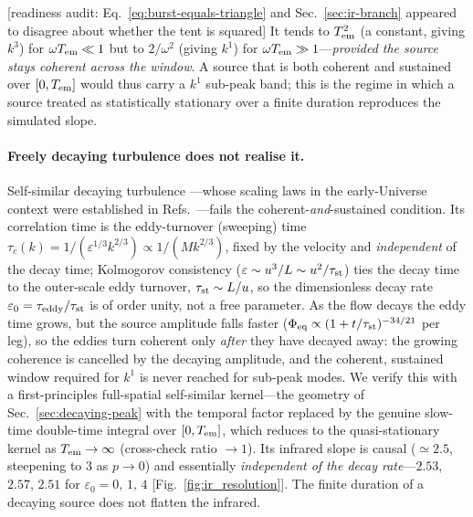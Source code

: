 \documentclass[10pt,prd,aps,nobibnotes,superscriptaddress,preprintnumbers,notitlepage]{revtex4-1}
\newcommand{\why}[1]{{\color{red}\footnotesize\textsf{[#1]}}}
\newcommand{\why}[1]{}
\begin{document}
\why{readiness audit: Eq.~\eqref{eq:burst-equals-triangle} and
Sec.~\ref{sec:ir-branch} appeared to disagree about whether the tent is squared}
It tends to $T_{\rm em}^2$ (a constant, giving $k^3$) for $\omega T_{\rm em}\ll1$ but to
$2/\omega^2$ (giving $k^1$) for $\omega T_{\rm em}\gg1$---\emph{provided the source stays
coherent across the window}. A source that is both coherent and sustained over
$[0,T_{\rm em}]$ would thus carry a $k^1$ sub-peak band; this is the regime in which a source
treated as statistically stationary over a finite duration reproduces the simulated slope.

\paragraph{Freely decaying turbulence does not realise it.} Self-similar decaying turbulence
---whose scaling laws in the early-Universe context were established in
Refs.~\cite{Brandenburg:1996fc,Banerjee:2004df}---fails the
coherent-\emph{and}-sustained condition. Its correlation time is the eddy-turnover
(sweeping) time $\tau_c(k)=1/(\varepsilon^{1/3}k^{2/3})\propto1/(Mk^{2/3})$, fixed by the
velocity and \emph{independent} of the decay time; Kolmogorov consistency
($\varepsilon\sim u^3/L\sim u^2/\tau_{\rm st}$) ties the decay time to the outer-scale eddy
turnover, $\tau_{\rm st}\sim L/u$, so the dimensionless decay rate
$\varepsilon_0=\tau_{\rm eddy}/\tau_{\rm st}$ is of order unity, not a free parameter. As the
flow decays the eddy time grows, but the source amplitude falls faster
($\Phi_{\rm eq}\propto(1+t/\tau_{\rm st})^{-34/21}$ per leg), so the eddies turn coherent only
\emph{after} they have decayed away: the growing coherence is cancelled by the decaying
amplitude, and the coherent, sustained window required for $k^1$ is never reached for sub-peak
modes. We verify this with a first-principles full-spatial self-similar kernel---the geometry
of Sec.~\ref{sec:decaying-peak} with the temporal factor replaced by the genuine slow-time
double-time integral over $[0,T_{\rm em}]$, which reduces to the quasi-stationary kernel as
$T_{\rm em}\to\infty$ (cross-check ratio $\to1$). Its infrared slope is causal ($\simeq2.5$,
steepening to $3$ as $p\to0$) and essentially \emph{independent of the decay rate}---$2.53$,
$2.57$, $2.51$ for $\varepsilon_0=0,\,1,\,4$ [Fig.~\ref{fig:ir_resolution}]. The finite
duration of a decaying source does not flatten the infrared.
\end{document}
